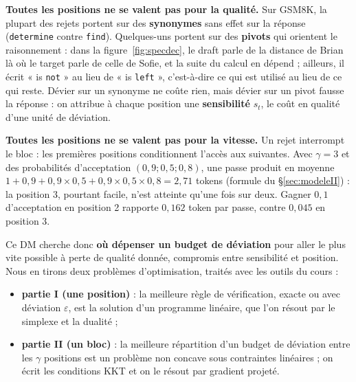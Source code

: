 \documentclass[11pt,a4paper]{article}
\newcommand{\tok}[1]{\texttt{#1}}
\theoremstyle{plain}
\begin{document}
\textbf{Toutes les positions ne se valent pas pour la qualité.}
Sur GSM8K, la plupart des rejets portent sur des \textbf{synonymes} sans effet sur la réponse (\tok{determine} contre \tok{find}).
Quelques-uns portent sur des \textbf{pivots} qui orientent le raisonnement : dans la figure~\ref{fig:specdec}, le draft parle de la distance de Brian là où le target parle de celle de Sofie, et la suite du calcul en dépend ; ailleurs, il écrit « is \tok{not} » au lieu de « is \tok{left} », c'est-à-dire ce qui est utilisé au lieu de ce qui reste.
Dévier sur un synonyme ne coûte rien, mais dévier sur un pivot fausse la réponse : on attribue à chaque position une \textbf{sensibilité} $s_t$, le coût en qualité d'une unité de déviation.

\textbf{Toutes les positions ne se valent pas pour la vitesse.}
Un rejet interrompt le bloc : les premières positions conditionnent l'accès aux suivantes.
Avec $\gamma=3$ et des probabilités d'acceptation $(0{,}9;0{,}5;0{,}8)$, une passe produit en moyenne $1+0{,}9+0{,}9\times0{,}5+0{,}9\times0{,}5\times0{,}8=2{,}71$ tokens (formule du §\ref{sec:modeleII}) : la position 3, pourtant facile, n'est atteinte qu'une fois sur deux.
Gagner $0{,}1$ d'acceptation en position 2 rapporte $0{,}162$ token par passe, contre $0{,}045$ en position 3.

Ce DM cherche donc \textbf{où dépenser un budget de déviation} pour aller le plus vite possible à perte de qualité donnée, compromis entre sensibilité et position.
Nous en tirons deux problèmes d'optimisation, traités avec les outils du cours :
\begin{itemize}
\item \textbf{partie I (une position)} : la meilleure règle de vérification, exacte ou avec déviation $\varepsilon$, est la solution d'un programme linéaire, que l'on résout par le simplexe et la dualité ;
\item \textbf{partie II (un bloc)} : la meilleure répartition d'un budget de déviation entre les $\gamma$ positions est un problème non concave sous contraintes linéaires ; on écrit les conditions KKT et on le résout par gradient projeté.
\end{itemize}
\end{document}
